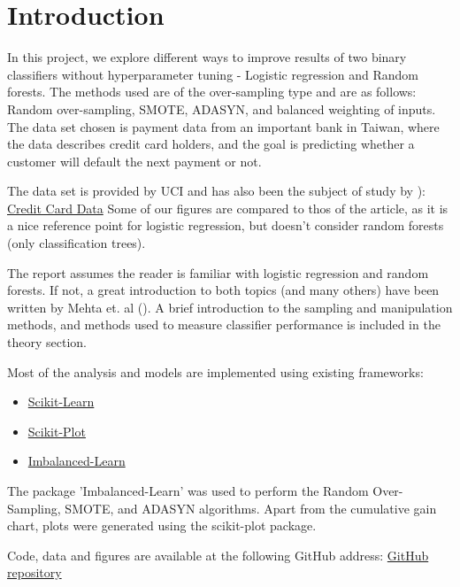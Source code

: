 \section{Introduction}
In this project, we explore different ways to improve results of two binary
classifiers without hyperparameter tuning - Logistic regression and
Random forests. The methods used are of the over-sampling type and are as
follows: Random over-sampling, SMOTE, ADASYN, and balanced weighting of
inputs.
The data set chosen is payment data from an important bank in Taiwan, 
where the data describes credit card holders, and the goal is predicting 
whether a customer will default the next payment or not.

The data set is provided by UCI and has also been the subject of study by \cite{ComparisonData}): 
\href{https://archive.ics.uci.edu/ml/datasets/default+of+credit+card+clients}{Credit Card Data}
Some of our figures are compared to thos of the article, as it is a nice
reference point for logistic regression, but doesn't consider random forests
(only classification trees).

The report assumes the reader is familiar with logistic regression and
random forests. If not, a great introduction to both topics (and many others)
have been written by Mehta et. al (\cite{mehta-article}).
A brief introduction to the sampling and manipulation methods, and methods
used to measure classifier performance is included in the theory section.

Most of the analysis and models are implemented using existing frameworks:
\begin{itemize}
\item \href{https://scikit-learn.org/}{Scikit-Learn}
\item \href{https://pypi.org/project/scikit-plot/0.3.7/}{Scikit-Plot}
\item \href{https://imbalanced-learn.org/en/stable/}{Imbalanced-Learn}
\end{itemize}
The package 'Imbalanced-Learn' was used to perform the Random Over-Sampling,
SMOTE, and ADASYN algorithms. Apart from the cumulative gain chart, 
plots were generated using the scikit-plot package.

Code, data and figures are available at the following GitHub address:
\href{https://github.com/geirtul/fys-stk4155/tree/master/project3}{GitHub repository}


